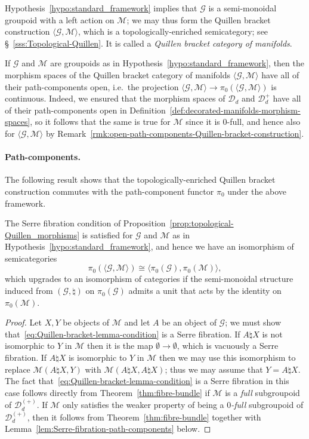 \documentclass[AHL,Unicode,published]{cedram}
\newcommand{\cD}{\mathcal{D}}
\newcommand{\cG}{\mathcal{G}}
\newcommand{\cM}{\mathcal{M}}
\begin{document}
Hypothesis~\ref{hypo:standard_framework} implies that $\cG$ is a semi-monoidal groupoid with a left action on $\cM$; we may thus form the Quillen bracket construction $\langle \cG, \cM \rangle$, which is a topologically-enriched semicategory; see \S~\ref{sss:Topological-Quillen}. It is called a \emph{Quillen bracket category of manifolds}.

\begin{rema}\label{rmk:framework-open-path-components}
If $\cG$ and $\cM$ are groupoids as in Hypothesis~\ref{hypo:standard_framework}, then the morphism spaces of the Quillen bracket category of manifolds $\langle \cG, \cM \rangle$ have all of their path-components open, i.e.~the projection $\langle \cG, \cM \rangle \to \pi_{0}(\langle \cG, \cM \rangle)$ is continuous. Indeed, we ensured that the morphism spaces of $\cD_{d}$ and $\cD_{d}^{+}$ have all of their path-components open in Definition~\ref{def:decorated-manifolds-morphism-spaces}, so it follows that the same is true for $\cM$ since it is $0$-full, and hence also for $\langle \cG, \cM \rangle$ by Remark~\ref{rmk:open-path-components-Quillen-bracket-construction}.
\end{rema}


\paragraph*{Path-components.}

The following result shows that the topologically-enriched Quillen bracket construction commutes with the path-component functor $\pi_{0}$ under the above framework.

\begin{lemm}\label{lem:Serre-fibration-condition}
The Serre fibration condition of Proposition~\ref{prop:topological-Quillen_morphisms} is satisfied for $\cG$ and $\cM$ as in Hypothesis~\ref{hypo:standard_framework}, and hence we have an isomorphism of semicategories
\[
\pi_{0}(\langle \cG, \cM \rangle) \cong \langle \pi_{0}(\cG), \pi_{0}(\cM) \rangle,
\]
which upgrades to an isomorphism of categories if the semi-monoidal structure induced from $(\cG,\natural)$ on $\pi_{0}(\cG)$ admits a unit that acts by the identity on $\pi_{0}(\cM)$.
\end{lemm}
\begin{proof}
Let $X,Y$ be objects of $\cM$ and let $A$ be an object of $\cG$; we must show that~\eqref{eq:Quillen-bracket-lemma-condition} is a Serre fibration. If $A\natural X$ is not isomorphic to $Y$ in $\cM$ then it is the map $\emptyset \to \emptyset$, which is vacuously a Serre fibration. If $A\natural X$ is isomorphic to $Y$ in $\cM$ then we may use this isomorphism to replace $\cM(A\natural X,Y)$ with $\cM(A\natural X,A\natural X)$; thus we may assume that $Y = A\natural X$. The fact that~\eqref{eq:Quillen-bracket-lemma-condition} is a Serre fibration in this case follows directly from Theorem~\ref{thm:fibre-bundle} if $\cM$ is a \emph{full} subgroupoid of $\cD_{d}^{(+)}$. If $\cM$ only satisfies the weaker property of being a \emph{$0$-full} subgroupoid of $\cD_{d}^{(+)}$, then it follows from Theorem~\ref{thm:fibre-bundle} together with Lemma~\ref{lem:Serre-fibration-path-components} below.
\end{proof}
\end{document}
